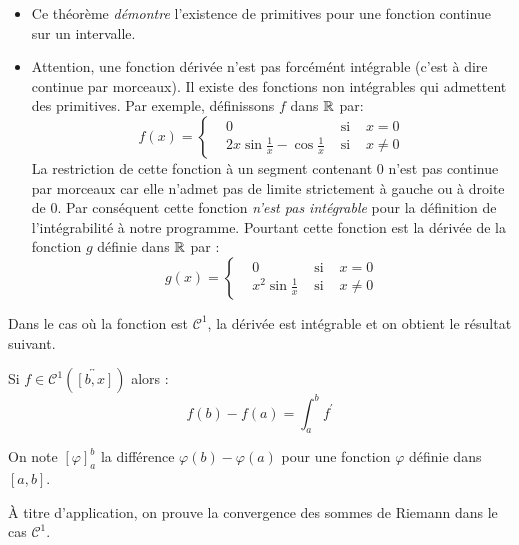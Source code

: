 \begin{rems}
\begin{itemize}
 \item Ce théorème \emph{démontre} l'existence de primitives pour une fonction continue sur un intervalle.
\item Attention, une fonction dérivée n'est pas forcémént intégrable (c'est à dire continue par morceaux). Il existe des fonctions non intégrables qui admettent des primitives.\newline
Par exemple, définissons $f$ dans $\mathbb{R}$ par:
\begin{displaymath}
 f(x) = \left\lbrace
\begin{aligned}
 &0 &\text{ si }& x=0 \\
&2x\sin\frac{1}{x} - \cos\frac{1}{x}&\text{ si }& x\neq 0 
\end{aligned}
 \right. 
\end{displaymath}
La restriction de cette fonction à un segment contenant $0$ n'est pas continue par morceaux car elle n'admet pas de limite strictement à gauche ou à droite de $0$. Par conséquent cette fonction \emph{n'est pas intégrable} pour la définition de l'intégrabilité à notre programme. Pourtant cette fonction est la dérivée de la fonction $g$ définie dans $\mathbb{R}$ par :
\begin{displaymath}
 g(x) = \left\lbrace
\begin{aligned}
 &0 &\text{ si }& x=0 \\
&x^2\sin\frac{1}{x} &\text{ si }& x\neq 0 
\end{aligned}
 \right. 
\end{displaymath}
\end{itemize}
\end{rems}
 Dans le cas où la fonction est $\mathcal C^1$, la dérivée est intégrable et on obtient le résultat suivant.
\begin{prop}
 Si $f\in \mathcal C^1(\overleftrightarrow{[b,x]})$ alors :
\begin{displaymath}
 f(b) - f(a) = \int _a ^b f^\prime
\end{displaymath}
\end{prop}
\begin{nota}
 On note $[\varphi]_a^b$ la différence $\varphi(b)-\varphi(a)$ pour une fonction $\varphi$ définie dans $[a,b]$.
\end{nota}

\`A titre d'application, on prouve la convergence des sommes de Riemann dans le cas $\mathcal{C}^1$.
